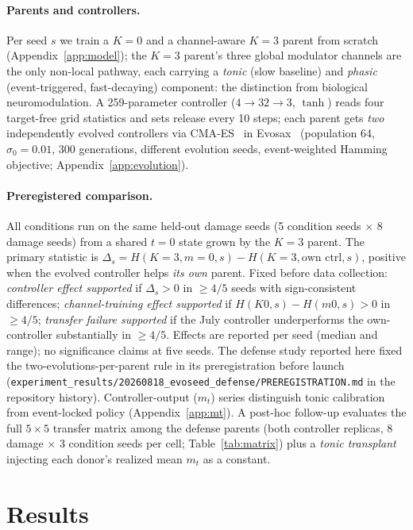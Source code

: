 \documentclass{article}
\begin{document}
\paragraph{Parents and controllers.}
Per seed $s$ we train a $K{=}0$ and a channel-aware $K{=}3$ parent from
scratch (Appendix~\ref{app:model}); the $K{=}3$ parent's three global
modulator channels are the only non-local pathway, each carrying a
\emph{tonic} (slow baseline) and \emph{phasic} (event-triggered,
fast-decaying) component: the distinction from biological
neuromodulation. A 259-parameter controller ($4{\to}32{\to}3$,
$\tanh$) reads four target-free grid statistics and sets release every
10 steps; each parent gets \emph{two} independently evolved controllers
via CMA-ES~\cite{hansen2006cma} in Evosax~\cite{lange2022evosax}
(population 64, $\sigma_0{=}0.01$, 300 generations, different evolution
seeds, event-weighted Hamming objective; Appendix~\ref{app:evolution}).

\paragraph{Preregistered comparison.}
All conditions run on the same held-out damage seeds (5 condition seeds
$\times$ 8 damage seeds) from a shared $t{=}0$ state grown by the $K{=}3$
parent. The primary statistic is
$\Delta_s = H(K{=}3, m{=}0, s) - H(K{=}3, \text{own ctrl}, s)$,
positive when the evolved controller helps \emph{its own} parent. Fixed
before data collection: \emph{controller effect supported} if $\Delta_s >
0$ in $\geq 4/5$ seeds with sign-consistent differences;
\emph{channel-training effect supported} if $H(K0,s) - H(m0,s) > 0$ in
$\geq 4/5$; \emph{transfer failure supported} if the July controller
underperforms the own-controller substantially in $\geq 4/5$. Effects are
reported per seed (median and range); no significance claims at five
seeds. The defense study reported here fixed the
two-evolutions-per-parent rule in its preregistration before launch
(\texttt{experiment\_results/20260818\_evoseed\_defense/PREREGISTRATION.md}
in the repository history). Controller-output ($m_t$) series distinguish
tonic calibration from event-locked policy (Appendix~\ref{app:mt}). A
post-hoc follow-up evaluates the full $5{\times}5$ transfer matrix among
the defense parents (both controller replicas, 8 damage $\times$ 3
condition seeds per cell; Table~\ref{tab:matrix}) plus a \emph{tonic
transplant} injecting each donor's realized mean $m_t$ as a constant.

\section{Results}
\label{sec:results}
\end{document}
